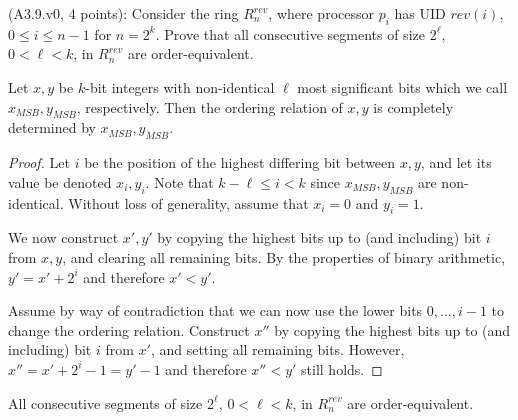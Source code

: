 \newcommand{\off}[1]{\text{off}_{#1}}
\newcommand{\rev}[1]{\text{rev}(#1)}

\begin{Exc}{(A3.9.v0, 4 points):}
Consider the ring $R_n^{rev}$, where processor $p_i$ has UID
$rev(i)$, $0\leq i \leq n-1$ for $n=2^k$. Prove that all
consecutive segments of size $2^\ell$, $0<\ell < k$, in $R_n^{rev}$
are order-equivalent.
\end{Exc}

\begin{lemma} \label{lemma:msb_order}
Let $x, y$ be $k$-bit integers with non-identical $\ell$ most significant bits
which we call $x_{MSB}, y_{MSB}$, respectively. Then the ordering relation of $x, y$ is
completely determined by $x_{MSB}, y_{MSB}$.
\end{lemma}

\begin{proof}
Let $i$ be the position of the highest differing bit between $x, y$, and let
its value be denoted $x_i, y_i$. Note that
$k - \ell \leq i < k$ since $x_{MSB}, y_{MSB}$ are non-identical. 
Without loss of generality, assume that $x_i = 0$ and $y_i = 1$.

We now construct $x', y'$ by copying the highest bits up to (and including) bit 
$i$ from $x, y$, and clearing all remaining bits. By the properties of binary 
arithmetic, $y' = x' + 2^i$ and therefore $x' < y'$.

Assume by way of contradiction that we can now use the lower bits $0, \ldots, i - 1$
to change the ordering relation. Construct $x''$ by copying the highest bits up
to (and including) bit $i$ from $x'$, and setting all remaining bits. However,
$x'' = x' + 2^i - 1 = y' - 1$ and therefore $x'' < y'$ still holds.
\end{proof}

\begin{theorem}
All consecutive segments of size $2^\ell$, $0<\ell < k$, in $R_n^{rev}$
are order-equivalent.
\end{theorem}

